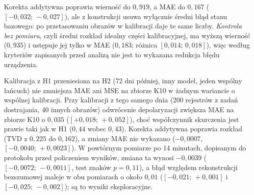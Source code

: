 Korekta addytywna poprawia wierność do $0{,}919$, a MAE do $0{,}167$ ($[-0{,}032;\,-0{,}027]$), ale z konstrukcji usuwa wyłącznie średni błąd stanu bazowego: po przetasowaniu obrazów w kalibracji daje te same liczby.
\emph{Kontrola bez pomiaru}, czyli średni rozkład idealny części kalibracyjnej, ma wyższą wierność ($0{,}935$) i ustępuje jej tylko w MAE ($0{,}183$; różnica $[0{,}014;\,0{,}018]$), więc według kryteriów zapisanych przed analizą nie jest to wykazana redukcja błędu urządzenia.

Kalibracja z H1 przeniesiona na H2 (72 dni później, inny model, jeden wspólny łańcuch) nie zmniejsza MAE ani MSE na zbiorze K10 w żadnym wariancie o wspólnej kalibracji.
Przy kalibracji z tego samego dnia (200 rejestrów z zadań dostrajania, 40 innych obrazów) odwrócenie depolaryzacji zwiększa MAE na zbiorze K10 o $0{,}035$ ($[+0{,}018;\,+0{,}052]$), choć współczynnik skurczenia jest prawie taki jak w H1 ($0{,}44$ wobec $0{,}43$).
Korekta addytywna poprawia rozkład (TVD z $0{,}225$ do $0{,}162$), a zmiany MAE nie wykazano ($-0{,}0007$, $[-0{,}0040;\,+0{,}0023]$).
W powtórnym pomiarze po 14 minutach, dopisanym do protokołu przed policzeniem wyników, zmiana ta wynosi $-0{,}0039$ ($[-0{,}0072;\,-0{,}0011]$, test znaków $p=0{,}11$), a błąd względem rekonstrukcji bezszumowej maleje w obu pomiarach o około $0{,}01$ ($[-0{,}021;\,+0{,}001]$ i $[-0{,}025;\,-0{,}002]$); są to wyniki eksploracyjne.

